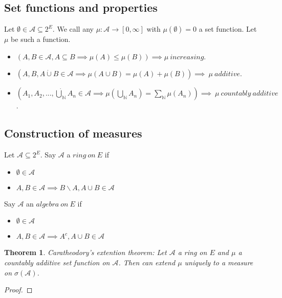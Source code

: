 \documentclass{article}
\newtheorem{theorem}{Theorem}[section]
\begin{document}
\subsection{Set functions and properties}
Let $\emptyset\in\mathcal{A}\subseteq2^E$.  We call any $\mu:\mathcal{A}\rightarrow[0,\infty]$ with $\mu(\emptyset)=0$ a set function.  Let $\mu$ be such a function.
\begin{itemize}
  \item $(A,B\in\mathcal{A},A\subseteq B \implies \mu(A)\leq\mu(B))\implies \mu~increasing$.
  \item $(A,B,A\dot{\cup} B \in \mathcal{A}\implies \mu(A\cup B)=\mu(A)+\mu(B))\implies~\mu~additive$.
  \item $(A_1,A_2,...,\dot{\bigcup}_\mathbb{N} A_n \in \mathcal{A}\implies \mu(\bigcup_\mathbb{N}A_n)=\sum_\mathbb{N}\mu(A_n))\implies~\mu~countably~additive$.
\end{itemize}

\subsection{Construction of measures}
Let $\mathcal{A}\subseteq2^E$.  Say $\mathcal{A}$ a $ring~on~E$ if
\begin{itemize}
  \item $\emptyset\in\mathcal{A}$
  \item $A,B\in\mathcal{A}\implies B\backslash A,A\cup B\in\mathcal{A}$
\end{itemize}
Say $\mathcal{A}$ an $algebra~on~E$ if
\begin{itemize}
  \item $\emptyset\in\mathcal{A}$
  \item $A,B\in\mathcal{A}\implies A^c,A\cup B\in\mathcal{A}$
\end{itemize}
\begin{theorem}
  Caratheodory's extention theorem: Let $\mathcal{A}$ a ring on $E$ and $\mu$ a countably additive set function on $\mathcal{A}$.  Then can extend $\mu$ uniquely to a measure on $\sigma(\mathcal{A})$.
\end{theorem}
\begin{proof}
\end{proof}
\end{document}
